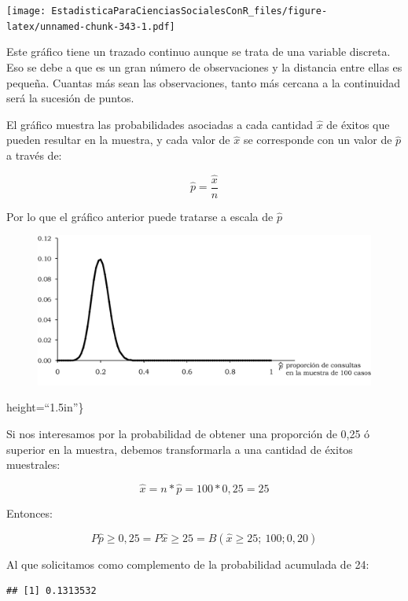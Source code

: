 \documentclass[]{book}
\begin{document}
\texttt{[image: EstadisticaParaCienciasSocialesConR\_files/figure-latex/unnamed-chunk-343-1.pdf]}

Este gráfico tiene un trazado continuo aunque se trata de una variable
discreta. Eso se debe a que es un gran número de observaciones y la
distancia entre ellas es pequeña. Cuantas más sean las observaciones,
tanto más cercana a la continuidad será la sucesión de puntos.

El gráfico muestra las probabilidades asociadas a cada cantidad
\(\widehat{x}\) de éxitos que pueden resultar en la muestra, y cada valor
de \(\widehat{x}\) se corresponde con un valor de \(\widehat{p}\) a través
de:

\[\widehat{p} = \frac{\widehat{x}}{n}\]

Por lo que el gráfico anterior puede tratarse a escala de \(\widehat{p}\)

\begin{figure}

{\centering \includegraphics[width=18.28in]{imagenes/image155} 

}

\end{figure}

height=``1.5in''\}

Si nos interesamos por la probabilidad de obtener una proporción de 0,25 ó superior en la muestra, debemos transformarla a una cantidad de éxitos muestrales:

\[\widehat{x} = n*\widehat{p} = 100*0,25 = 25\]

Entonces:

\[P\widehat{p} \geq 0,25 = P\widehat{x} \geq 25 = B(\widehat{x} \geq 25;\ 100;0,20)\]

Al que solicitamos como complemento de la probabilidad acumulada de 24:

\begin{verbatim}
## [1] 0.1313532
\end{verbatim}
\end{document}
